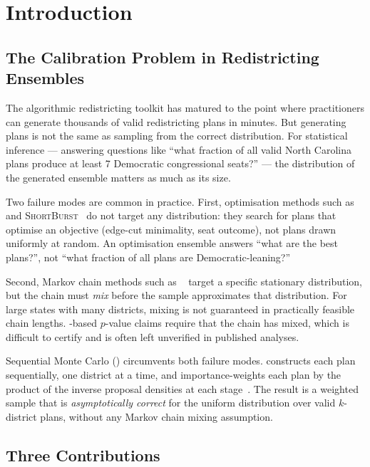 \section{Introduction}
\label{sec:introduction}

\subsection{The Calibration Problem in Redistricting Ensembles}

The algorithmic redistricting toolkit has matured to the point where
practitioners can generate thousands of valid redistricting plans in minutes.
But generating plans is not the same as sampling from the correct
distribution.
For statistical inference --- answering questions like ``what fraction of all
valid North Carolina plans produce at least 7 Democratic congressional seats?''
--- the distribution of the generated ensemble matters as much as its size.

Two failure modes are common in practice.
First, optimisation methods such as \cs{}~\citep{b11paper} and
\textsc{ShortBurst}~\citep{cannon2022,g6paper} do not target any
distribution: they search for plans that optimise an objective (edge-cut
minimality, seat outcome), not plans drawn uniformly at random.
An optimisation ensemble answers ``what are the best plans?'', not ``what
fraction of all plans are Democratic-leaning?''

Second, Markov chain methods such as \recom{}~\citep{deford2021} target a
specific stationary distribution, but the chain must \emph{mix} before the
sample approximates that distribution.
For large states with many districts, mixing is not guaranteed in
practically feasible chain lengths.
\recom{}-based $p$-value claims require that the chain has mixed, which is
difficult to certify and is often left unverified in published analyses.

Sequential Monte Carlo (\smc{}) circumvents both failure modes.
\smc{} constructs each plan sequentially, one district at a time, and
importance-weights each plan by the product of the inverse proposal densities
at each stage~\citep{fifield2020}.
The result is a weighted sample that is \emph{asymptotically correct} for the
uniform distribution over valid $k$-district plans, without any Markov chain
mixing assumption.

\subsection{Three Contributions}

